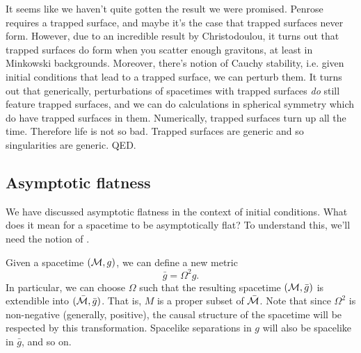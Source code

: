 It seems like we haven't quite gotten the result we were promised. Penrose requires a trapped surface, and maybe it's the case that trapped surfaces never form. However, due to an incredible result by Christodoulou, it turns out that trapped surfaces do form when you scatter enough gravitons, at least in Minkowski backgrounds. Moreover, there's notion of Cauchy stability, i.e. given initial conditions that lead to a trapped surface, we can perturb them. It turns out that generically, perturbations of spacetimes with trapped surfaces \emph{do} still feature trapped surfaces, and we can do calculations in spherical symmetry which do have trapped surfaces in them. Numerically, trapped surfaces turn up all the time. Therefore life is not so bad. Trapped surfaces are generic and so singularities are generic. QED.

\subsection*{Asymptotic flatness}
We have discussed asymptotic flatness in the context of initial conditions. What does it mean for a spacetime to be asymptotically flat? To understand this, we'll need the notion of .

Given a spacetime $(\mathcal{M},g)$, we can define a new metric
\begin{equation}
    \bar g= \Omega^2 g.
\end{equation}
In particular, we can choose $\Omega$ such that the resulting spacetime $(\mathcal{M},\bar g)$ is extendible into $(\bar {\mathcal{M}},\bar g)$. That is, $M$ is a proper subset of $\bar {\mathcal{M}}$. Note that since $\Omega^2$ is non-negative (generally, positive), the causal structure of the spacetime will be respected by this transformation. Spacelike separations in $g$ will also be spacelike in $\bar g$, and so on. 

